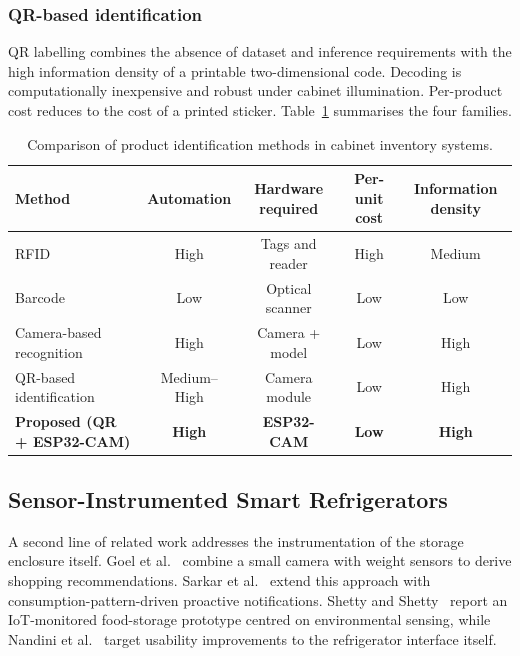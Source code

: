 \subsubsection{QR-based identification}
QR labelling combines the absence of dataset and inference
requirements with the high information density of a printable
two-dimensional code. Decoding is computationally inexpensive and
robust under cabinet illumination. Per-product cost reduces to the
cost of a printed sticker. Table~\ref{tab:identification-methods}
summarises the four families.

\begin{table}[t]
\caption{Comparison of product identification methods in cabinet inventory systems.}
\label{tab:identification-methods}
\centering
\renewcommand{\arraystretch}{1.25}
\begin{tabular}{@{}lcccc@{}}
\toprule
\textbf{Method} & \textbf{Automation} & \textbf{Hardware required} & \textbf{Per-unit cost} & \textbf{Information density} \\
\midrule
RFID                        & High         & Tags and reader  & High & Medium \\
Barcode                     & Low          & Optical scanner  & Low  & Low \\
Camera-based recognition    & High         & Camera + model   & Low  & High \\
QR-based identification     & Medium--High & Camera module    & Low  & High \\
\midrule
\textbf{Proposed (QR + ESP32-CAM)} & \textbf{High} & \textbf{ESP32-CAM} & \textbf{Low} & \textbf{High} \\
\bottomrule
\end{tabular}
\end{table}

\subsection{Sensor-Instrumented Smart Refrigerators}

A second line of related work addresses the instrumentation of the
storage enclosure itself. Goel et al.~\cite{goel2023iotfridge} combine
a small camera with weight sensors to derive shopping
recommendations. Sarkar et al.~\cite{sarkar2024proactive} extend this
approach with consumption-pattern-driven proactive notifications.
Shetty and Shetty~\cite{shetty2024monitoring} report an IoT-monitored
food-storage prototype centred on environmental sensing, while Nandini
et al.~\cite{nandini2023userconvenience} target usability improvements
to the refrigerator interface itself.

